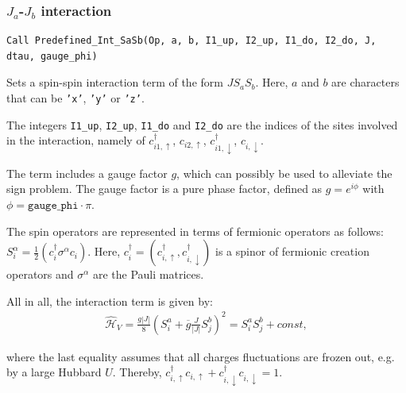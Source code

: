 \subsubsection{$J_a$-$J_b$ interaction}

\begin{lstlisting}[style=fortran]
Call Predefined_Int_SaSb(Op, a, b, I1_up, I2_up, I1_do, I2_do, J, dtau, gauge_phi)
\end{lstlisting}

Sets a spin-spin interaction term of the form $J S_a S_b$. Here, $a$ and $b$ are characters that can be \texttt{'x'}, \texttt{'y'} or \texttt{'z'}.

The integers \texttt{I1\_up}, \texttt{I2\_up}, \texttt{I1\_do} and \texttt{I2\_do} are the indices of the sites involved in the interaction, namely of $c^\dagger_{i1,\uparrow}$, $c_{i2,\uparrow}$, $c^\dagger_{i1,\downarrow}$, $c_{i,\downarrow}$.

The term includes a gauge factor $g$, which can possibly be used to alleviate the sign problem.
The gauge factor is a pure phase factor, defined as $g = e^{i \phi}$ with $\phi = \mathtt{gauge\_phi} \cdot \pi$.

The spin operators are represented in terms of fermionic operators as follows:
$S^{\alpha}_i = \frac{1}{2}(c^\dagger_i \sigma^\alpha c_i)$.
Here, $c^\dagger_i = (c^\dagger_{i,\uparrow}, c^\dagger_{i,\downarrow})$ is a spinor of fermionic creation operators and $\sigma^\alpha$ are the Pauli matrices.

All in all, the interaction term is given by:
\begin{align}
  \hat{\mathcal{H}}_{V} = \frac{g |J|}{8} 
  \left(S^a_i + \overline{g} \frac{J}{|J|} S^b_j\right)^2 = S^a_i S^b_j + const,
\end{align}

where the last equality  assumes that all charges fluctuations are frozen out, e.g. by a large Hubbard $U$.
Thereby, $c^\dagger_{i,\uparrow} c_{i,\uparrow} + c^\dagger_{i,\downarrow} c_{i,\downarrow} = 1$.

